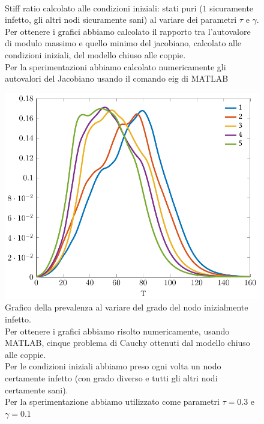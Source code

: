 \begin{figure}[ht]
\centering
\subfloat[][$\gamma=0.10$]
{\resizebox{0.45\textwidth}{!}{}}
 \quad 
\subfloat[][$\gamma=0.30$]
{\resizebox{0.45\textwidth}{!}{ }}
\\
\subfloat[][$\gamma=0.50$]
{\resizebox{0.45\textwidth}{!}
{}}
\quad
\subfloat[][$\gamma=0.70$]
{\resizebox{0.45\textwidth}{!}
{}
}
\caption[Stiff ratio alle condizioni iniziali sulla rete stradale del Minnesota al variare dei parametri ]{Stiff ratio calcolato alle condizioni iniziali:  stati puri ($1$ sicuramente infetto, gli altri nodi sicuramente sani) al variare dei parametri $\tau$ e $\gamma$.\\ Per ottenere i grafici abbiamo calcolato il rapporto tra l'autovalore di modulo massimo e quello minimo del jacobiano, calcolato alle condizioni iniziali, del modello chiuso alle coppie.\\
Per la sperimentazioni abbiamo calcolato numericamente gli autovalori del Jacobiano usando il comando eig di MATLAB}
\label{fig::minnesota_ratiostiff}
\end{figure}

\begin{figure}[htb]
\centering
\includegraphics[scale=0.45]{Figure/minnesota_prevalenza}
\caption[Grafico della prevalenza al variare del grado del nodo inizialmente infetto.]{Grafico della prevalenza al variare del grado del nodo inizialmente infetto.\\ Per ottenere i grafici abbiamo risolto numericamente, usando MATLAB, cinque problema di Cauchy ottenuti dal modello chiuso alle coppie.\\
Per le condizioni iniziali abbiamo preso ogni volta un nodo certamente infetto (con grado diverso e tutti gli altri nodi certamente sani).\\
Per la sperimentazione abbiamo utilizzato come parametri $\tau=0.3$ e $\gamma=0.1$}
\label{fig::minnesota_prevalenza}
\end{figure}
